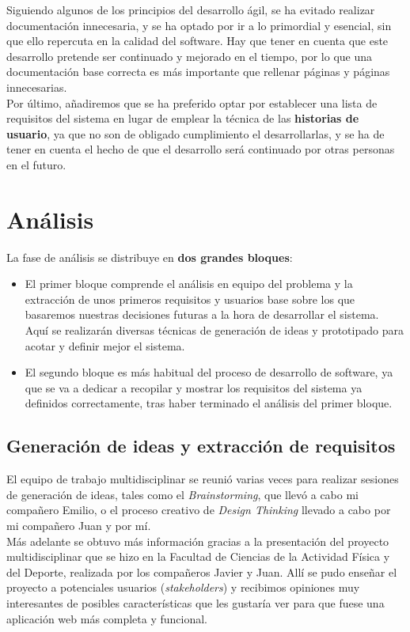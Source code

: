 Siguiendo algunos de los principios del desarrollo ágil, se ha evitado realizar documentación innecesaria, y se ha optado por ir a lo primordial y esencial, sin que ello repercuta en la calidad del software. Hay que tener en cuenta que este desarrollo pretende ser continuado y mejorado en el tiempo, por lo que una documentación base correcta es más importante que rellenar páginas y páginas innecesarias.\\

Por último, añadiremos que se ha preferido optar por establecer una lista de requisitos del sistema en lugar de emplear la técnica de las \textbf{historias de usuario}, ya que no son de obligado cumplimiento el desarrollarlas, y se ha de tener en cuenta el hecho de que el desarrollo será continuado por otras personas en el futuro.

\section{Análisis}
La fase de análisis se distribuye en \textbf{dos grandes bloques}:

\begin{itemize}
    \item El primer bloque comprende el análisis en equipo del problema y la extracción de unos primeros requisitos y usuarios base sobre los que basaremos nuestras decisiones futuras a la hora de desarrollar el sistema. Aquí se realizarán diversas técnicas de generación de ideas y prototipado para acotar y definir mejor el sistema.
    \item El segundo bloque es más habitual del proceso de desarrollo de software, ya que se va a dedicar a recopilar y mostrar los requisitos del sistema ya definidos correctamente, tras haber terminado el análisis del primer bloque.
\end{itemize}

\subsection{Generación de ideas y extracción de requisitos}
El equipo de trabajo multidisciplinar se reunió varias veces para realizar sesiones de generación de ideas, tales como el \textit{Brainstorming}, que llevó a cabo mi compañero Emilio, o el proceso creativo de \textit{Design Thinking} llevado a cabo por mi compañero Juan y por mí.\\

Más adelante se obtuvo más información gracias a la presentación del proyecto multidisciplinar que se hizo en la Facultad de Ciencias de la Actividad Física y del Deporte, realizada por los compañeros Javier y Juan. Allí se pudo enseñar el proyecto a potenciales usuarios (\textit{stakeholders}) y recibimos opiniones muy interesantes de posibles características que les gustaría ver para que fuese una aplicación web más completa y funcional.


